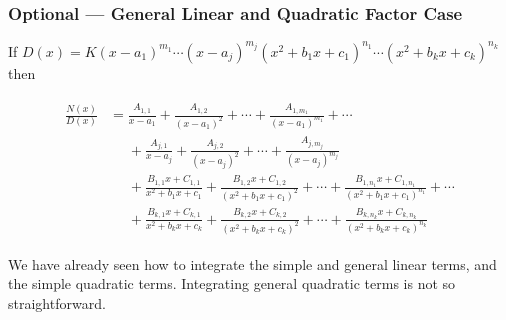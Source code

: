 \subsubsection*{Optional --- General Linear and Quadratic Factor Case}
If
$
D(x)=K(x-a_1)^{m_1}\cdots(x-a_j)^{m_j}
(x^2+b_1x+c_1)^{n_1}\cdots(x^2+b_kx+c_k)^{n_k}
$
then
\begin{impeqn}\label{eq:PFdecompd}
\begin{align*}
\begin{split}
\frac{N(x)}{D(x)}
&=\frac{A_{1,1}}{x-a_1}+\frac{A_{1,2}}{(x-a_1)^2}+\cdots
          +\frac{A_{1,m_1}}{(x-a_1)^{m_1}}+\cdots\\
&\phantom{=}\!+\frac{A_{j,1}}{x-a_j}+\frac{A_{j,2}}{(x-a_j)^2}+\cdots
          +\frac{A_{j,m_j}}{(x-a_j)^{m_j}}\\
&\phantom{=}\!+\frac{B_{1,1}x+C_{1,1}}{x^2+b_1x+c_1}
          +\frac{B_{1,2}x+C_{1,2}}{(x^2+b_1x+c_1)^2}+\!\cdots\!
          +\frac{B_{1,n_1}x+C_{1,n_1}}{(x^2+b_1x+c_1)^{n_1}}\!+\!\cdots\\
&\phantom{=}\!+\frac{B_{k,1}x+C_{k,1}}{x^2+b_kx+c_k}
          +\frac{B_{k,2}x+C_{k,2}}{(x^2+b_kx+c_k)^2}+\!\cdots\!
          +\frac{B_{k,n_k}x+C_{k,n_k}}{(x^2+b_kx+c_k)^{n_k}}
\end{split}
\end{align*}
\end{impeqn}
We have already seen how to integrate the simple and general linear terms, and the simple
quadratic terms. Integrating general quadratic terms is not so straightforward.
